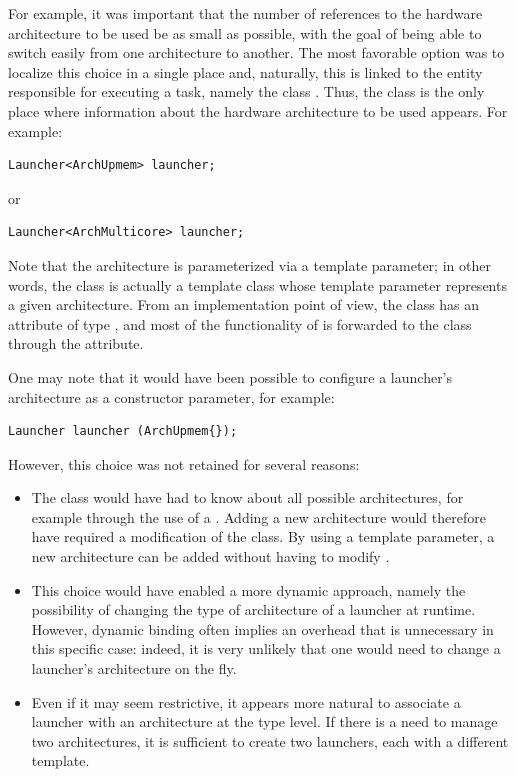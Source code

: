 For example, it was important that the number of references to the hardware architecture to be used be as small as possible, 
with the goal of being able to switch easily from one architecture to another. The most favorable option was to localize 
this choice in a single place and, naturally, this is linked to the entity responsible for executing a task, 
namely the class . Thus, the  class is the only place where information 
about the hardware architecture to be used appears. For example:
\begin{verbatim}
Launcher<ArchUpmem> launcher;
\end{verbatim}
or
\begin{verbatim}
Launcher<ArchMulticore> launcher;
\end{verbatim}
Note that the architecture is parameterized via a template parameter; in other words, 
the  class is actually a template class 
whose template parameter  represents a given architecture. 
From an implementation point of view, the  class has an attribute  of type , 
and most of the functionality of  is forwarded to the  class through the  attribute.

One may note that it would have been possible to configure a launcher’s architecture as a constructor parameter, for example:
\begin{verbatim}
Launcher launcher (ArchUpmem{});
\end{verbatim}
However, this choice was not retained for several reasons:
\begin{itemize}
\item The  class would have had to know about all possible architectures, for example through the use of a 
. Adding a new architecture would therefore have required a modification of the  class. 
By using a template parameter, a new architecture can be added without having to modify .
\item This choice would have enabled a more dynamic approach, namely the possibility of changing the type of architecture
 of a launcher at runtime. However, dynamic binding often implies an overhead that is unnecessary in this specific case: 
 indeed, it is very unlikely that one would need to change a launcher’s architecture on the fly.
\item Even if it may seem restrictive, it appears more natural to associate a launcher with an architecture at the type level. 
If there is a need to manage two architectures, it is sufficient to create two launchers, each with a different template.
\end{itemize}
	
